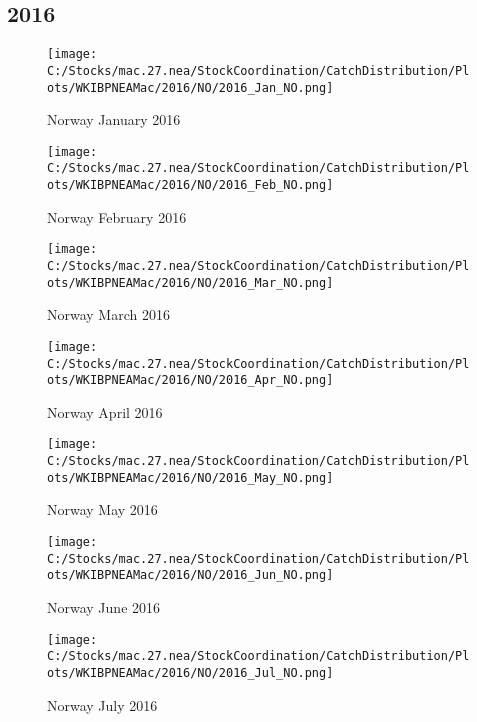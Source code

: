 \documentclass{article}
\begin{document}
\subsection{2016}



\begin{figure}[h]
	\centering
		\texttt{[image: C:/Stocks/mac.27.nea/StockCoordination/CatchDistribution/Plots/WKIBPNEAMac/2016/NO/2016\_Jan\_NO.png]}
	\caption{Norway January 2016}
	\label{fig:2016_Jan_NO}
\end{figure}

\begin{figure}
	\centering
		\texttt{[image: C:/Stocks/mac.27.nea/StockCoordination/CatchDistribution/Plots/WKIBPNEAMac/2016/NO/2016\_Feb\_NO.png]}
	\caption{Norway February 2016}
	\label{fig:2016_Feb_NO}
\end{figure}

\begin{figure}
	\centering
		\texttt{[image: C:/Stocks/mac.27.nea/StockCoordination/CatchDistribution/Plots/WKIBPNEAMac/2016/NO/2016\_Mar\_NO.png]}
	\caption{Norway March 2016}
	\label{fig:2016_Mar_NO}
\end{figure}

\begin{figure}
	\centering
		\texttt{[image: C:/Stocks/mac.27.nea/StockCoordination/CatchDistribution/Plots/WKIBPNEAMac/2016/NO/2016\_Apr\_NO.png]}
	\caption{Norway April 2016}
	\label{fig:2016_Apr_NO}
\end{figure}

\begin{figure}
	\centering
		\texttt{[image: C:/Stocks/mac.27.nea/StockCoordination/CatchDistribution/Plots/WKIBPNEAMac/2016/NO/2016\_May\_NO.png]}
	\caption{Norway May 2016}
	\label{fig:2016_May_NO}
\end{figure}

\begin{figure}
	\centering
		\texttt{[image: C:/Stocks/mac.27.nea/StockCoordination/CatchDistribution/Plots/WKIBPNEAMac/2016/NO/2016\_Jun\_NO.png]}
	\caption{Norway June 2016}
	\label{fig:2016_Jun_NO}
\end{figure}

\begin{figure}
	\centering
		\texttt{[image: C:/Stocks/mac.27.nea/StockCoordination/CatchDistribution/Plots/WKIBPNEAMac/2016/NO/2016\_Jul\_NO.png]}
	\caption{Norway July 2016}
	\label{fig:2016_Jul_NO}
\end{figure}
\end{document}
